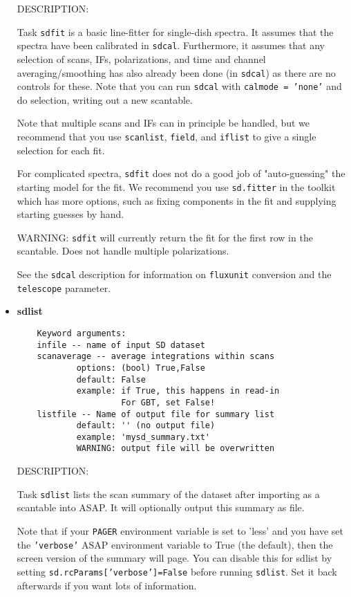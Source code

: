 \begin{itemize}
    DESCRIPTION:
    
    Task {\tt sdfit} is a basic line-fitter for single-dish spectra.
    It assumes that the spectra have been calibrated in {\tt sdcal}.
    Furthermore, it assumes that any selection of scans, IFs,
    polarizations, and time and channel averaging/smoothing has
    also already been done (in {\tt sdcal}) as there are no controls
    for these.  Note that you can run {\tt sdcal} with {\tt calmode 
    = 'none'} and do selection, writing out a new scantable.
    
    Note that multiple scans and IFs can in principle be handled, but
    we recommend that you use {\tt scanlist}, {\tt field}, and 
    {\tt iflist} to give a single selection for each fit.
    
    For complicated spectra, {\tt sdfit} does not do a good job of
    "auto-guessing" the starting model for the fit.  We recommend
    you use {\tt sd.fitter} in the toolkit which has more options, such
    as fixing components in the fit and supplying starting guesses
    by hand.
    
    WARNING: {\tt sdfit} will currently return the fit for the first
    row in the scantable.  Does not handle multiple polarizations.
    
    See the {\tt sdcal} description for information on {\tt fluxunit} 
    conversion and the {\tt telescope} parameter.

\item {\bf sdlist}

\begin{verbatim}
    Keyword arguments:
    infile -- name of input SD dataset
    scanaverage -- average integrations within scans
            options: (bool) True,False
            default: False
            example: if True, this happens in read-in
                     For GBT, set False!
    listfile -- Name of output file for summary list
            default: '' (no output file)
            example: 'mysd_summary.txt'
            WARNING: output file will be overwritten
\end{verbatim}
    
    DESCRIPTION:
    
    Task {\tt sdlist} lists the scan summary of the dataset after importing
    as a scantable into ASAP.  It will optionally output this summary
    as file.
    
    Note that if your {\tt PAGER} environment variable is set to 'less' and
    you have set the {\tt 'verbose'} ASAP environment variable to True
    (the default), then the screen version of the summary will page.
    You can disable this for sdlist by setting
         {\tt sd.rcParams['verbose']=False}
    before running {\tt sdlist}.  Set it back afterwards if you want lots
    of information.


\end{itemize}
